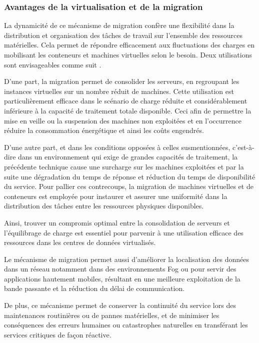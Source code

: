 \subsubsection{Avantages de la virtualisation et de la migration}
La dynamicité de ce mécanisme de migration confère une flexibilité dans la distribution et organisation des tâches de travail sur l'ensemble des ressources matérielles. Cela permet de répondre efficacement aux fluctuations des charges en mobilisant les conteneurs et machines virtuelles selon le besoin. Deux utilisations sont envisageables comme suit \cite{boutaba2013}.\par
D'une part, la migration permet de consolider les serveurs, en regroupant les instances virtuelles sur un nombre réduit de machines. Cette utilisation est particulièrement efficace dans le scénario de charge réduite et considérablement inférieure à la capacité de traitement totale disponible. Ceci afin de permettre la mise en veille ou la suspension des machines non exploitées et en l'occurrence réduire la consommation énergétique et ainsi les coûts engendrés.\par
D'une autre part, et dans les conditions opposées à celles susmentionnées, c'est-à-dire dans un environnement qui exige de grandes capacités de traitement, la précédente technique cause une surcharge sur les machines exploitées et par la suite une dégradation du temps de réponse et réduction du temps de disponibilité du service. Pour pallier ces contrecoups, la migration de machines virtuelles et de conteneurs est employée pour instaurer et assurer une uniformité dans la distribution des tâches entre les ressources physiques disponibles.\par
Ainsi, trouver un compromis optimal entre la consolidation de serveurs et l'équilibrage de charge est essentiel pour parvenir à une utilisation efficace des ressources dans les centres de données virtualisés.\par
Le mécanisme de migration permet aussi d'améliorer la localisation des données dans un réseau notamment dans des environnements Fog ou pour servir des applications hautement mobiles, résultant en une meilleure exploitation de la bande passante et la réduction du délai de communication.\par
De plus, ce mécanisme permet de conserver la continuité du service lors des maintenances routinières ou de pannes matérielles, et de minimiser les conséquences des erreurs humaines ou catastrophes naturelles en transférant les services critiques de façon réactive.

